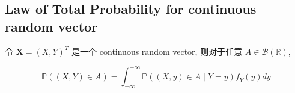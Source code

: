 \subsection{Law of Total Probability for continuous random vector}\label{law-of-total-probability-for-continuous-random-vector}

\begin{theorem}

令 \(\mathbf{X} = (\mathit{X},\mathit{Y})^{\mathit{T}}\) 是一个 continuous random vector, 则对于任意 \(\mathit{A} \in \mathcal{B}(\mathbb{R})\),

\[\mathbb{P}((\mathit{X},\mathit{Y}) \in \mathit{A}) = \int_{- \infty}^{+ \infty}\mathbb{P}((\mathit{X},\mathit{y}) \in \mathit{A} \mid \mathit{Y} = \mathit{y})\mathit{f}_{\mathit{Y}}(\mathit{y})\mathit{d}\mathit{y}\]

\end{theorem}

